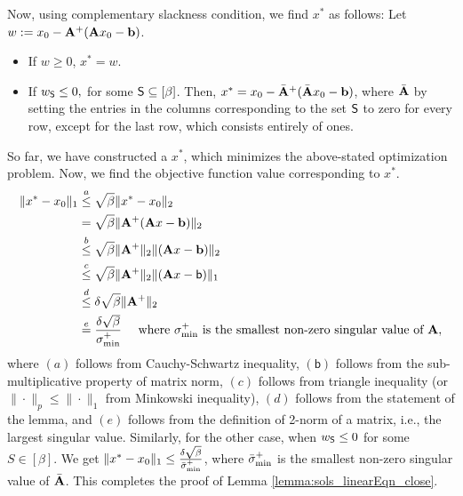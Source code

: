 \noindent Now, using complementary slackness condition, we find $x^*$ as follows: Let $w := x_0 - \mathbf{A}^+(\mathbf{A} x_0-\mathbf{b})$. 
\begin{itemize}
    \item If $w\geq 0$, $x^* = w$. 
    \item If $w_{\mathsf{S}} \leq 0,$ for some $\mathsf{S}\subseteq [\beta]$. Then, $x^* = x_0 - \bar{\mathbf{A}}^+(\bar{\mathbf{A}} x_0-\mathbf{b})$, where $\bar{\mathbf{A}}$ by setting the entries in the columns corresponding to the set 
$\mathsf{S}$ to zero for every row, except for the last row, which consists entirely of ones. 
\end{itemize}
So far, we have constructed a $x^*$, which minimizes the above-stated optimization problem. Now, we find the objective function value corresponding to $x^*$.
\begin{align*}
   \|x^*-x_0\|_1 &\overset{a}{\leq} \sqrt{\beta}\|x^*-x_0\|_2 \\
    &= \sqrt{\beta} \|\mathbf{A}^{+}(\mathbf{A} x-\mathbf{b})\|_2 \\
    &\overset{b}{\leq} \sqrt{\beta} \|\mathbf{A}^{+}\|_2 \|(\mathbf{A} x-\mathbf{b})\|_2 \\
    &\overset{c}{\leq} \sqrt{\beta} \|\mathbf{A}^{+}\|_2 \|(\mathbf{A} x-\mathsf{b})\|_1 \\
    &\overset{d}{\leq} \delta \sqrt{\beta} \|\mathbf{A}^{+}\|_2 \\
    &\overset{e}{=} \frac{\delta \sqrt{\beta}}{\sigma^{+}_{\min}} \quad \text{ where $\sigma^{+}_{\min}$ is the smallest non-zero singular value of $\mathbf{A}$},
\end{align*}
where $(a)$ follows from Cauchy-Schwartz inequality, $(\mathsf{b})$ follows from the sub-multiplicative property of matrix norm, $(c)$ follows from triangle inequality (or $\|\cdot\|_p \leq \|\cdot\|_1$ from Minkowski inequality), $(d)$ follows from the statement of the lemma, and $(e)$ follows from the definition of 2-norm of a matrix, i.e., the largest singular value.  Similarly, for the other case, when $w_{\mathsf{S}} \leq 0$ for some $S\in[\beta]$. We get $\|x^*-x_0\|_1 \leq \frac{\delta\sqrt{\beta}}{\bar{\sigma}^{+}_{\text{min}}}$, where $\bar{\sigma}^{+}_{\min}$ is the smallest non-zero singular value of $\bar{\mathbf{A}}$. This completes the proof of Lemma \ref{lemma:sols_linearEqn_close}.
